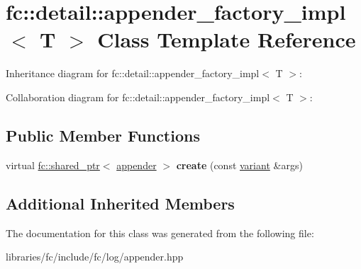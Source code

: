 \hypertarget{classfc_1_1detail_1_1appender__factory__impl}{}\section{fc\+:\+:detail\+:\+:appender\+\_\+factory\+\_\+impl$<$ T $>$ Class Template Reference}
\label{classfc_1_1detail_1_1appender__factory__impl}


Inheritance diagram for fc\+:\+:detail\+:\+:appender\+\_\+factory\+\_\+impl$<$ T $>$\+:


Collaboration diagram for fc\+:\+:detail\+:\+:appender\+\_\+factory\+\_\+impl$<$ T $>$\+:
\subsection*{Public Member Functions}
\begin{DoxyCompactItemize}
\item 
\mbox{\label{classfc_1_1detail_1_1appender__factory__impl_ac93ddd921fd852a3182f02105a8e45ec}} 
virtual \mbox{\hyperlink{classfc_1_1shared__ptr}{fc\+::shared\+\_\+ptr}}$<$ \mbox{\hyperlink{classfc_1_1appender}{appender}} $>$ {\bfseries create} (const \mbox{\hyperlink{classfc_1_1variant}{variant}} \&args)
\end{DoxyCompactItemize}
\subsection*{Additional Inherited Members}


The documentation for this class was generated from the following file\+:\begin{DoxyCompactItemize}
\item 
libraries/fc/include/fc/log/appender.\+hpp\end{DoxyCompactItemize}
